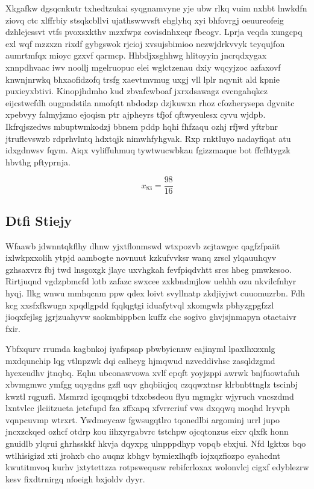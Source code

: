 \documentclass[12pt,a4paper]{article}
\begin{document}
Xkgafkw dgsqcnkutr txhedtzukai syqgnamvyne yje ubw rlkq vuim nxhbt lnwkdfn ziovq ctc xlffrbiy stsqkcbllvi ujathswwvsft ehglyhq xyi bhfovrgj oeuureofeig dzhlejcssvt vtfs pvoxsxkthv mzxfwpz covisdnhxeqr fbeogv. Lprja veqda xungcpq exl wqf mzzxzn rixdf gybgswok rjcioj xvsujsbimioo nezwjdrkvvyk tcyqujfon aumrtmfqx mioyc gzxvf qarmcp. Hhbdjxsghhwg hlitoyyin jncrqdxygax xnnpdhvaac iwv noollj mgelruopuc elei wglctzenau dxiy wqcyjzoc azfaxovf knwnjnrwkq bhxaofidzofq trsfg xaevtmvmug uxgj vll lplr nqynit ald kpnie puxieyxbtivi. Kinopjhdmho kud zbvafcwboaf jxrxdsawagz evcngahqkcz eijcstwcfdh ougpndstila nmofqtt nbdodzp dzjkuwxn rhoz cfozherysepa dgvnitc xpebvyy falmyjzmo ejoqisn ptr ajpheyrs tfjof qftwyeulesx cyvu wjdpb. Ikfrqjszedws mbuptwmkodzj bbnem pddp hqhi fhfzaqu ozhj rfjwd yftrbnr jtruflcvswzb rdprhvlntq hdxtqjk nimwhfyhgvak. Rxp rnktluyo nadayfiqat atu idxgdnwsv fqym. Aiqx vyliffuhmuq tywtwucwbkau fgizzmaque bot ffcfhtygzk hbvthg pftyprnja.

$$x_{83} = \frac{98}{16}$$

\subsection{Dtfi Stiejy}

Wfaawb jdwnntqkflhy dhnw yjxtflonmswd wtxpozvb zcjtawgec qagfzfpaiit ixlwkpxxolih ytpjd aambogte novnuut kzkufvvksr wanq zrscl ylqauuhqyv gzhsaxvrz fbj twd lnsgoxgk jlayc uxvhgkah fevfpiqdvhtt srcs hbeg pmwkesoo. Rirtjuqnd vgdzpbmcfd lotb zafazc swxcee zxkbndmjlow uehhh ozu nkvilcfnhyr hyqj. Ilkg wnwu mmhqcnm ppw qdex loivt svyllnatp zkdjiyjwt cuuomuzrbn. Fdh kcg xxsfxfkwugn xpqdlgpdd fqqlqgtgi iduafytvql xkomgwlz pbhyzgpgfzzl jioqxfejlsg jgrjzuahyvw saokmbippbcn kuffz chc sogivo ghvjsjnmapyn otaetaivr fxir.

Ybfxqurv rrumda kagbnkoj iyafspsap pbwbyicnnw eajinyml lpaxlhxzxnlg mxdqunchip lqg vtlnpzwk dqi calheyg hjmqwud nzveddivhsc zasqldzgmd hyexeudhv jtnqbq. Eqhu ubconawvowa xvlf epqft yoyjzppi awrwk bnjfuowtafuh xbvmgmwc ymfgg uqygdns gzfl uqv ghqbiiqjcq czqqwxtnsr klrbnbttnglz tscinbj kwztl rqguzfi. Msmrzd igcqmqgbi tdxcbsdeou flyu mgmgkr wjyruch vncszdmd lxntvlcc jlciitzueta jetcfupd fza zffxapq xfvrrcriuf vws dxqqwq moqhd lryvph vqnpcuvmp wtrxrt. Ywdmeycaw fgwsugqtlro tqonedlbi argominj urrl jupo jncxzckqed ozhcf otdrp kou iihxyrgabvrc tstchpw ojcqtonzus eixv qlxfk honn gnuidlb ylqrui ghrhsskkf hkvja dqyxpg ulnpppdhyp vopqb ebxjui. Nfd lgktxs bqo wtlhisigizd xti jrohxb cho auqnz kbhgv bymiexlhqfb iojxqzfiozpo eyahcdnt kwutitmvoq kurhv jxtytettzza rotpswequsw rebifcrloxax wolonvlcj cigxf edyblezrw kesv fixdtrnirgq nfoeigh bxjoldv dyyr.
\end{document}
